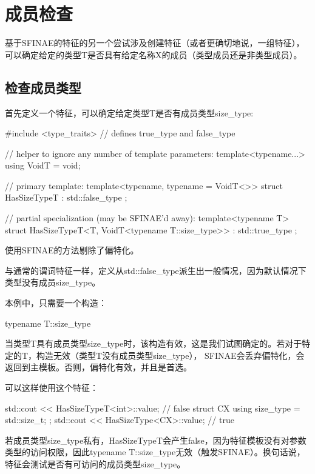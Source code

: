 \section{成员检查}

基于SFINAE的特征的另一个尝试涉及创建特征（或者更确切地说，一组特征），可以确定给定的类型T是否具有给定名称X的成员（类型成员还是非类型成员）。

\subsection{检查成员类型}

首先定义一个特征，可以确定给定类型T是否有成员类型size\_type:

\begin{cpp}
#include <type_traits> // defines true_type and false_type

// helper to ignore any number of template parameters:
template<typename...> using VoidT = void;

// primary template:
template<typename, typename = VoidT<>>
struct HasSizeTypeT : std::false_type
{};

// partial specialization (may be SFINAE'd away):
template<typename T>
struct HasSizeTypeT<T, VoidT<typename T::size_type>> : std::true_type
{};
\end{cpp}

使用SFINAE的方法剔除了偏特化。

与通常的谓词特征一样，定义从std::false\_type派生出一般情况，因为默认情况下类型没有成员size\_type。

本例中，只需要一个构造：

\begin{cpp}
typename T::size_type
\end{cpp}

当类型T具有成员类型size\_type时，该构造有效，这是我们试图确定的。若对于特定的T，构造无效（类型T没有成员类型size\_type）， SFINAE会丢弃偏特化，会返回到主模板。否则，偏特化有效，并且是首选。

可以这样使用这个特征：

\begin{cpp}
std::cout << HasSizeTypeT<int>::value; // false
struct CX {
	using size_type = std::size_t;
};
std::cout << HasSizeType<CX>::value; // true
\end{cpp}

若成员类型size\_type私有，HasSizeTypeT会产生false，因为特征模板没有对参数类型的访问权限，因此typename T::size\_type无效（触发SFINAE）。换句话说，特征会测试是否有可访问的成员类型size\_type。

